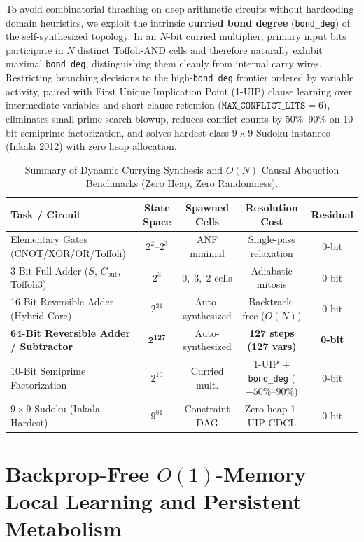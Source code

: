 \documentclass[11pt, a4paper]{article}
\begin{document}
To avoid combinatorial thrashing on deep arithmetic circuits without hardcoding domain heuristics, we exploit the intrinsic \textbf{curried bond degree} (\texttt{bond\_deg}) of the self-synthesized topology. In an $N$-bit curried multiplier, primary input bits participate in $N$ distinct Toffoli-AND cells and therefore naturally exhibit maximal \texttt{bond\_deg}, distinguishing them cleanly from internal carry wires. Restricting branching decisions to the high-\texttt{bond\_deg} frontier ordered by variable activity, paired with First Unique Implication Point (1-UIP) clause learning over intermediate variables and short-clause retention ($\texttt{MAX\_CONFLICT\_LITS} = 6$), eliminates small-prime search blowup, reduces conflict counts by 50\%--90\% on 10-bit semiprime factorization, and solves hardest-class $9 \times 9$ Sudoku instances (Inkala 2012) with zero heap allocation.

\begin{table}[htbp]
\centering
\small
\caption{Summary of Dynamic Currying Synthesis and $O(N)$ Causal Abduction Benchmarks (Zero Heap, Zero Randomness).}
\label{tab:abduction_bench}
\begin{tabularx}{\textwidth}{@{}Xcccc@{}}
\toprule
\textbf{Task / Circuit} & \textbf{State Space} & \textbf{Spawned Cells} & \textbf{Resolution Cost} & \textbf{Residual} \\
\midrule
Elementary Gates (CNOT/XOR/OR/Toffoli) & $2^2$--$2^3$ & ANF minimal & Single-pass relaxation & 0-bit \\
3-Bit Full Adder ($S$, $C_{\mathrm{out}}$, Toffoli3) & $2^3$ & $0,\; 3,\; 2$ cells & Adiabatic mitosis & 0-bit \\
16-Bit Reversible Adder (Hybrid Core) & $2^{31}$ & Auto-synthesized & Backtrack-free ($O(N)$) & 0-bit \\
\textbf{64-Bit Reversible Adder / Subtractor} & $\mathbf{2^{127}}$ & Auto-synthesized & \textbf{127 steps (127 vars)} & \textbf{0-bit} \\
10-Bit Semiprime Factorization & $2^{10}$ & Curried mult. & 1-UIP + \texttt{bond\_deg} ($-50\%$--$90\%$) & 0-bit \\
$9 \times 9$ Sudoku (Inkala Hardest) & $9^{81}$ & Constraint DAG & Zero-heap 1-UIP CDCL & 0-bit \\
\bottomrule
\end{tabularx}
\end{table}

\section{Backprop-Free $O(1)$-Memory Local Learning and Persistent Metabolism}
\label{sec:metabolism}
\end{document}
